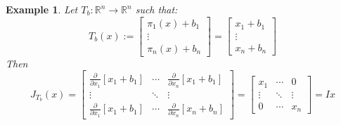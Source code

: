 \documentclass[12pt]{extarticle}
\theoremstyle{plain}
\theoremstyle{Definition}
\theoremstyle{Definition}
\theoremstyle{plain}
\newtheorem{exmp}{Example}[section]
\begin{document}
\begin{exmp} 
	Let $T_b : \mathbb{R}^n \to \mathbb{R}^n$ such that:
	\[
	T_b(x) := 
	\begin{bmatrix}
	\pi_1(x) + b_1 \\ 
	\vdots \\ 
	\pi_n(x) + b_n
	\end{bmatrix}
	= 
	\begin{bmatrix}
	x_1 + b_1 \\ 
	\vdots \\ 
	x_n + b_n
	\end{bmatrix}
	\]
	Then
	\[
	J_{T_b}(x) = 
	\begin{bmatrix} 
	\frac{\partial }{\partial x_1}[x_1 + b_1] & \cdots & \frac{\partial }{\partial x_n}[x_1 + b_1] \\
	\vdots & \ddots & \vdots \\ 
	\frac{\partial }{\partial x_1}[x_1 + b_1] & \cdots & \frac{\partial }{\partial x_n}[x_n + b_n] 
	\end{bmatrix}
	=
	\begin{bmatrix} 
	x_1 & \cdots & 0 \\
	\vdots & \ddots & \vdots \\ 
	0 & \cdots & x_n
	\end{bmatrix}
	= Ix
	\]
\end{exmp}
\end{document}
